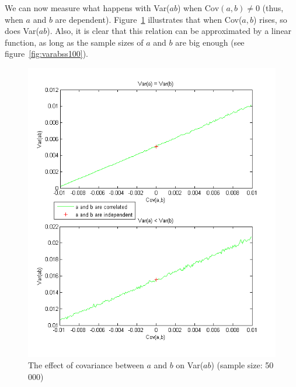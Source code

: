 \newpage
We can now measure what happens with Var($ab$) when $\mbox{Cov}(a,b) \neq 0$ (thus, when $a$ and $b$ are dependent). Figure~\ref{fig:varab} illustrates that when Cov($a,b$) rises, so does Var($ab$). Also, it is clear that this relation can be approximated by a linear function, as long as the sample sizes of $a$ and $b$ are big enough (see figure~\ref{fig:varabss100}).

\begin{figure}[h]
\centering
\includegraphics[scale=0.70]{img/varabss50000.png}
\caption{The effect of covariance between $a$ and $b$ on Var($ab$) (sample size: 50\,000)}
\label{fig:varab}
\end{figure}

